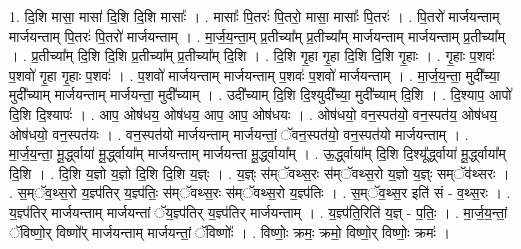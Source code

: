 \documentclass[17pt]{extarticle}
\begin{document}
1. दि॒शि मासा॒ मासा॑ दि॒शि दि॒शि मासाः᳚ । . मासाः᳚ पि॒तरः॑ पि॒तरो॒ मासा॒ मासाः᳚ पि॒तरः॑ । . पि॒तरो॑ मार्जयन्ताम् मार्जयन्ताम् पि॒तरः॑ पि॒तरो॑ मार्जयन्ताम् । . मा॒र्ज॒य॒न्ता॒म् प्र॒तीच्या᳚म् प्र॒तीच्या᳚म् मार्जयन्ताम् मार्जयन्ताम् प्र॒तीच्या᳚म् । . प्र॒तीच्या᳚म् दि॒शि दि॒शि प्र॒तीच्या᳚म् प्र॒तीच्या᳚म् दि॒शि । . दि॒शि गृ॒हा गृ॒हा दि॒शि दि॒शि गृ॒हाः । . गृ॒हाः प॒शवः॑ प॒शवो॑ गृ॒हा गृ॒हाः प॒शवः॑ । . प॒शवो॑ मार्जयन्ताम् मार्जयन्ताम् प॒शवः॑ प॒शवो॑ मार्जयन्ताम् । . मा॒र्ज॒य॒न्ता॒ मुदी᳚च्या॒ मुदी᳚च्याम् मार्जयन्ताम् मार्जयन्ता॒ मुदी᳚च्याम् । . उदी᳚च्याम् दि॒शि दि॒श्युदी᳚च्या॒ मुदी᳚च्याम् दि॒शि । . दि॒श्याप॒ आपो॑ दि॒शि दि॒श्यापः॑ । . आप॒ ओष॑धय॒ ओष॑धय॒ आप॒ आप॒ ओष॑धयः । . ओष॑धयो॒ वन॒स्पत॑यो॒ वन॒स्पत॑य॒ ओष॑धय॒ ओष॑धयो॒ वन॒स्पत॑यः । . वन॒स्पत॑यो मार्जयन्ताम् मार्जयन्तां॒ ॅवन॒स्पत॑यो॒ वन॒स्पत॑यो मार्जयन्ताम् । . मा॒र्ज॒य॒न्ता॒ मू॒र्द्ध्वाया॑ मू॒र्द्ध्वाया᳚म् मार्जयन्ताम् मार्जयन्ता मू॒र्द्ध्वाया᳚म् । . ऊ॒र्द्ध्वाया᳚म् दि॒शि दि॒श्यू᳚र्द्ध्वाया॑ मू॒र्द्ध्वाया᳚म् दि॒शि । . दि॒शि य॒ज्ञो य॒ज्ञो दि॒शि दि॒शि य॒ज्ञ्ः । . य॒ज्ञ्ः स॑म्ॅवथ्स॒रः स॑म्ॅवथ्स॒रो य॒ज्ञो य॒ज्ञ्ः सम्ॅव॑थ्सरः । . स॒म्ॅव॒थ्स॒रो य॒ज्ञ्प॑तिर् य॒ज्ञ्प॑तिः॒ स॑म्ॅवथ्स॒रः स॑म्ॅवथ्स॒रो य॒ज्ञ्प॑तिः । . स॒म्ॅव॒थ्स॒र इति॑ सं - व॒थ्स॒रः । . य॒ज्ञ्प॑तिर् मार्जयन्ताम् मार्जयन्तां ॅय॒ज्ञ्प॑तिर् य॒ज्ञ्प॑तिर् मार्जयन्ताम् । . य॒ज्ञ्प॑ति॒रिति॑ य॒ज्ञ् - प॒तिः॒ । . मा॒र्ज॒य॒न्तां॒ ॅविष्णो॒र् विष्णो᳚र् मार्जयन्ताम् मार्जयन्तां॒ ॅविष्णोः᳚ । . विष्णोः॒ क्रमः॒ क्रमो॒ विष्णो॒र् विष्णोः॒ क्रमः॑ । \newline
\end{document}
